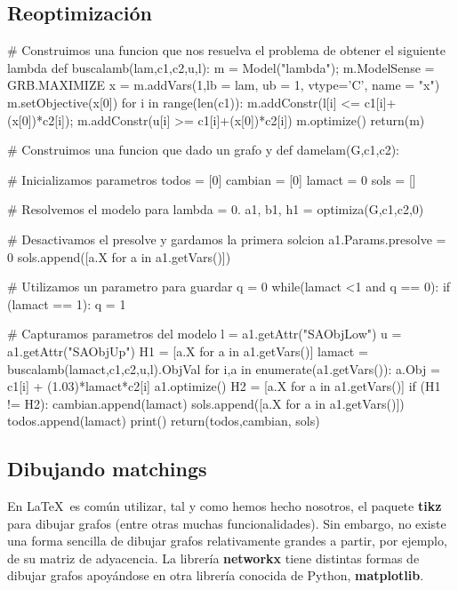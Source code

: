 \documentclass[twoside,a4paper,openright,12pt,tikz]{book}
\begin{document}
\subsection{Reoptimización}
\begin{pythone}

# Construimos una funcion que nos resuelva el problema de obtener el siguiente lambda
def buscalamb(lam,c1,c2,u,l):  
    m = Model("lambda");
    m.ModelSense = GRB.MAXIMIZE
    x = m.addVars(1,lb = lam, ub = 1, vtype='C', name = "x")
    m.setObjective(x[0])
    for i in range(len(c1)):
        m.addConstr(l[i] <= c1[i]+(x[0])*c2[i]);
        m.addConstr(u[i] >= c1[i]+(x[0])*c2[i])
    m.optimize()    
    return(m)
    

# Construimos una funcion que dado un grafo y 
def damelam(G,c1,c2):
    
    # Inicializamos parametros
    todos = [0]
    cambian = [0]
    lamact = 0
    sols = []
    
    # Resolvemos el modelo para lambda = 0.
    a1, b1, h1 = optimiza(G,c1,c2,0)
    
    # Desactivamos el presolve y gardamos la primera solcion
    a1.Params.presolve = 0
    sols.append([a.X for a in a1.getVars()])
    
    # Utilizamos un parametro para guardar 
    q = 0
    while(lamact <1 and q == 0):
        if (lamact == 1):
            q = 1
            
        # Capturamos parametros del modelo
        l = a1.getAttr("SAObjLow")
        u = a1.getAttr("SAObjUp")
        H1 = [a.X for a in a1.getVars()]
        lamact = buscalamb(lamact,c1,c2,u,l).ObjVal
        for i,a in enumerate(a1.getVars()):
            a.Obj = c1[i] + (1.03)*lamact*c2[i]
        a1.optimize()
        H2 = [a.X for a in a1.getVars()]
        if (H1 != H2):
            cambian.append(lamact)
        sols.append([a.X for a in a1.getVars()])
        todos.append(lamact)
    print()
    return(todos,cambian, sols)
\end{pythone}
\newpage
\subsection{Dibujando matchings}
En \LaTeX\, es común utilizar, tal y como hemos hecho nosotros, el paquete \textbf{tikz} para dibujar grafos (entre otras muchas funcionalidades). Sin embargo, no existe una forma sencilla de dibujar grafos relativamente grandes a partir, por ejemplo, de su matriz de adyacencia. La librería \textbf{networkx} tiene distintas formas de dibujar grafos apoyándose en otra librería conocida de Python, \textbf{matplotlib}. 
\end{document}
